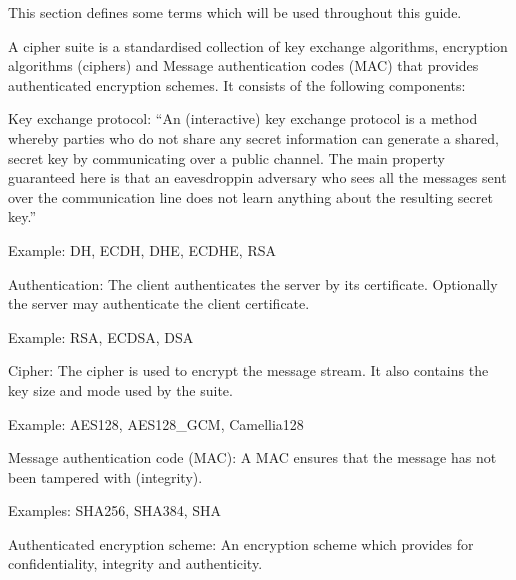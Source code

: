 
This section defines some terms which will be used throughout this guide.


A cipher suite is a standardised collection of key exchange algorithms, encryption 
algorithms (ciphers) and Message authentication codes (MAC) that provides authenticated 
encryption schemes. It consists of the following components:

\begin{description}
\item{Key exchange protocol:}
``An (interactive) key exchange protocol is a method whereby parties who do not 
share any secret information can generate a shared, secret key by communicating 
over a public channel. The main property guaranteed here is that an 
eavesdroppin adversary who sees all the messages sent over the communication 
line does not learn anything about the resulting secret key.'' \cite{katz2008introduction}

Example: DH, ECDH, DHE, ECDHE, RSA

\item{Authentication:}
The client authenticates the server by its certificate. Optionally the server 
may authenticate the client certificate.

Example: RSA, ECDSA, DSA

\item{Cipher:}
The cipher is used to encrypt the message stream. It also contains the key size
and mode used by the suite.

Example: AES128, AES128\_GCM, Camellia128

\item{Message authentication code (MAC):}
A MAC ensures that the message has not been tampered with (integrity).

Examples: SHA256, SHA384, SHA


\item{Authenticated encryption scheme:}
An encryption scheme which provides for confidentiality, integrity and authenticity.

\end{description}
